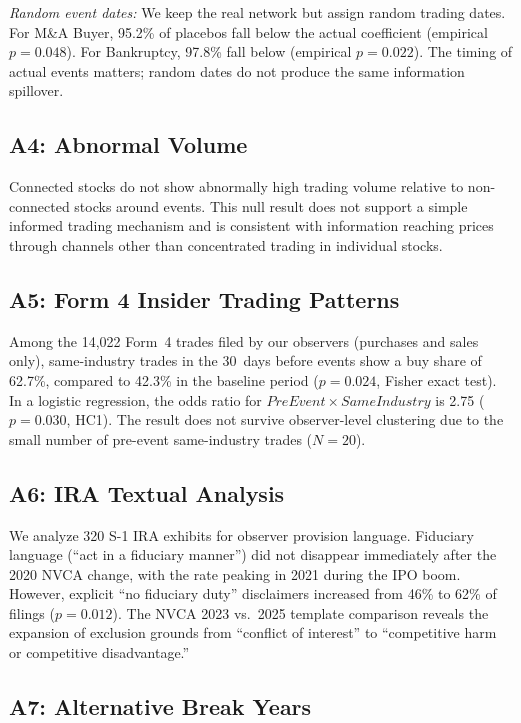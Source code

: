 \textit{Random event dates:} We keep the real network but assign random trading dates. For M\&A Buyer, 95.2\% of placebos fall below the actual coefficient (empirical $p=0.048$). For Bankruptcy, 97.8\% fall below (empirical $p=0.022$). The timing of actual events matters; random dates do not produce the same information spillover.

\subsection*{A4: Abnormal Volume}

Connected stocks do not show abnormally high trading volume relative to non-connected stocks around events. This null result does not support a simple informed trading mechanism and is consistent with information reaching prices through channels other than concentrated trading in individual stocks.

\subsection*{A5: Form 4 Insider Trading Patterns}

Among the 14,022 Form~4 trades filed by our observers (purchases and sales only), same-industry trades in the 30~days before events show a buy share of 62.7\%, compared to 42.3\% in the baseline period ($p=0.024$, Fisher exact test). In a logistic regression, the odds ratio for $PreEvent \times SameIndustry$ is 2.75 ($p=0.030$, HC1). The result does not survive observer-level clustering due to the small number of pre-event same-industry trades ($N=20$).

\subsection*{A6: IRA Textual Analysis}

We analyze 320 S-1 IRA exhibits for observer provision language. Fiduciary language (``act in a fiduciary manner'') did not disappear immediately after the 2020 NVCA change, with the rate peaking in 2021 during the IPO boom. However, explicit ``no fiduciary duty'' disclaimers increased from 46\% to 62\% of filings ($p=0.012$). The NVCA 2023 vs.\ 2025 template comparison reveals the expansion of exclusion grounds from ``conflict of interest'' to ``competitive harm or competitive disadvantage.''

\subsection*{A7: Alternative Break Years}

